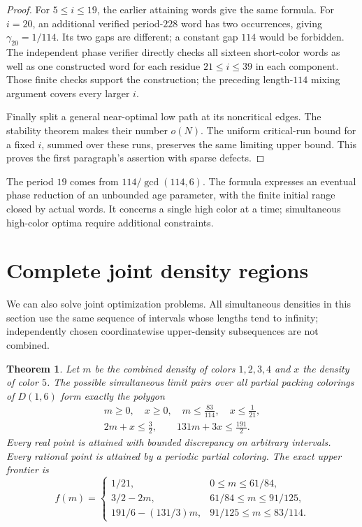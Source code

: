 \documentclass[11pt,reqno]{amsart}
\theoremstyle{plain}
\newtheorem{theorem}{Theorem}
\newcommand{\D}[1]{D(1,#1)}
\theoremstyle{plain}
\theoremstyle{plain}
\begin{document}
\begin{proof}
For $5\le i\le19$, the earlier attaining words give the same formula.
For $i=20$, an additional verified period-$228$ word has two occurrences,
giving $\gamma_{20}=1/114$. Its two gaps are different; a constant gap
$114$ would be forbidden. The independent phase verifier directly checks
all sixteen short-color words as well as one constructed word for each
residue $21\le i\le39$ in each component. Those finite checks support
the construction; the preceding length-$114$ mixing argument covers every
larger $i$.

Finally split a general near-optimal low path at its noncritical edges.
The stability theorem makes their number $o(N)$. The uniform critical-run
bound for a fixed $i$, summed over these runs, preserves the same limiting
upper bound. This proves the first paragraph's assertion with sparse defects.
\end{proof}

The period $19$ comes from $114/\gcd(114,6)$. The formula expresses an
eventual phase reduction of an unbounded age parameter, with the finite
initial range closed by actual words. It concerns a single high color at
a time; simultaneous high-color optima require additional constraints.



\section{Complete joint density regions}\label{M-sec:density-regions}

We can also solve joint optimization problems. All simultaneous densities
in this section use the same sequence of intervals whose lengths tend to
infinity; independently chosen
coordinatewise upper-density subsequences are not combined.

\begin{theorem}\label{M-thm:global-density-region}
Let $m$ be the combined density of colors $1,2,3,4$ and $x$ the density
of color $5$. The possible simultaneous limit pairs over all partial
packing colorings of $\D{6}$ form exactly the polygon
\begin{equation}\label{M-eq:global-density-polygon}
 \begin{gathered}
 m\ge0,\quad x\ge0,\quad m\le\frac{83}{114},\quad x\le\frac1{21},\\
 2m+x\le\frac32,\qquad131m+3x\le\frac{191}{2}.
 \end{gathered}
\end{equation}
Every real point is attained with bounded discrepancy on arbitrary
intervals. Every rational point is attained by a periodic partial coloring.
The exact upper frontier is
\[
f(m)=\begin{cases}
1/21,&0\le m\le61/84,\\
3/2-2m,&61/84\le m\le91/125,\\
191/6-(131/3)m,&91/125\le m\le83/114.
\end{cases}
\]
\end{theorem}
\end{document}
